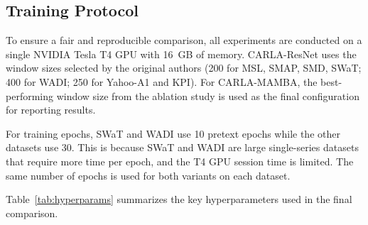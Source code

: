 \documentclass[runningheads]{llncs}
\begin{document}
\subsection{Training Protocol}
 
To ensure a fair and reproducible comparison, all experiments are conducted on a single NVIDIA Tesla T4 GPU with 16~GB of memory. CARLA-ResNet uses the window sizes selected by the original authors \cite{darban2024carla} (200 for MSL, SMAP, SMD, SWaT; 400 for WADI; 250 for Yahoo-A1 and KPI). For CARLA-MAMBA, the best-performing window size from the ablation study is used as the final configuration for reporting results.
 
For training epochs, SWaT and WADI use 10 pretext epochs while the other datasets use 30. This is because SWaT and WADI are large single-series datasets that require more time per epoch, and the T4 GPU session time is limited. The same number of epochs is used for both variants on each dataset.
 
Table~\ref{tab:hyperparams} summarizes the key hyperparameters used in the final comparison.
 
\noindent
\begin{minipage}{\linewidth}
\centering

\captionsetup{type=table}
\caption{Hyperparameter settings for CARLA-ResNet and CARLA-MAMBA (final configuration). Window sizes for CARLA-MAMBA reflect the best-performing value from the ablation study.}
\label{tab:hyperparams}

\vspace{0.5em}


\end{minipage}
\end{document}
